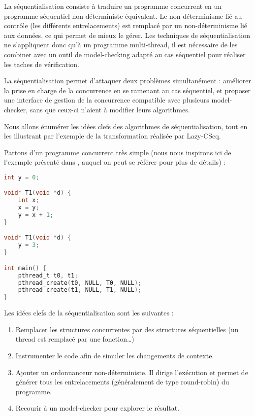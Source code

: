 La séquentialisation consiste à traduire un programme concurrent en un programme
séquentiel non-déterministe équivalent. Le non-déterminisme lié au contrôle (les
différents entrelacements) est remplacé par un non-déterminisme lié aux données,
ce qui permet de mieux le gérer. Les techniques de séquentialisation ne
s'appliquent donc qu'à un programme multi-thread, il est nécessaire de les
combiner avec un outil de model-checking adapté au cas séquentiel pour réaliser
les taches de vérification.

La séquentialisation permet d'attaquer deux problèmes simultanément : améliorer
la prise en charge de la concurrence en se ramenant au cas séquentiel, et
proposer une interface de gestion de la concurrence compatible avec plusieurs
model-checker, sans que ceux-ci n'aient à modifier leurs algorithmes.

Nous allons énumérer les idées clefs des algorithmes de séquentialisation, tout
en les illustrant par l'exemple de la transformation réalisée par
Lazy-CSeq\cite{LazyCSeq}.

Partons d'un programme concurrent très simple (nous nous inspirons ici
de l'exemple présenté dans \cite{LazyCSeq}, auquel on peut se
référer pour plus de détails) :

\begin{lstlisting}[language=C]
int y = 0;

void* T1(void *d) {
    int x;
    x = y;
    y = x + 1;
}

void* T1(void *d) {
    y = 3;
}

int main() {
    pthread_t t0, t1;
    pthread_create(t0, NULL, T0, NULL);
    pthread_create(t1, NULL, T1, NULL);
}
\end{lstlisting}

Les idées clefs de la séquentialisation sont les suivantes :

\begin{enumerate}
\def\labelenumi{\arabic{enumi})}
\item
  Remplacer les structures concurrentes par des structures séquentielles
  (un thread est remplacé par une fonction\dots)
\item
  Instrumenter le code afin de simuler les changements de contexte.
\item
  Ajouter un ordonnanceur non-déterministe. Il dirige l'exécution et
  permet de générer tous les entrelacements (généralement de type
  round-robin) du programme.
\item
  Recourir à un model-checker pour explorer le résultat.
\end{enumerate}

